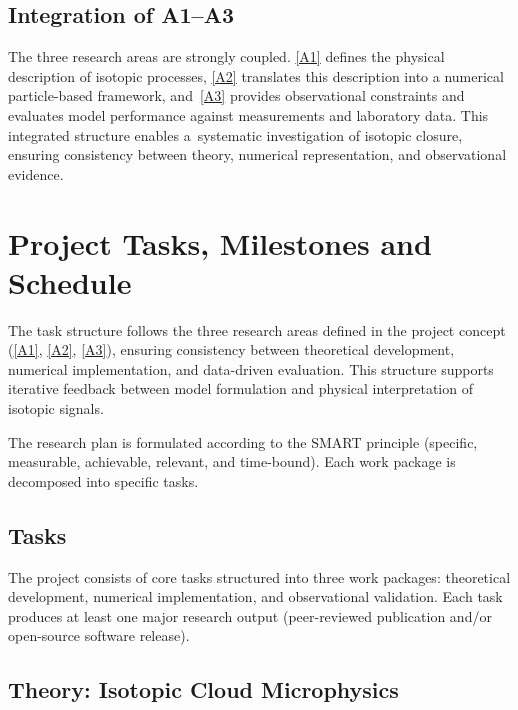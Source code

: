 \documentclass[12pt]{article}
\newcounter{task}
\begin{document}
\subsection*{Integration of A1--A3}
The three research areas are strongly coupled.
\ref{A1} defines the physical
description of isotopic processes,
\ref{A2} translates this description into a
numerical particle-based framework,
and~\ref{A3}
provides observational constraints and evaluates model performance
against measurements and laboratory data.
This integrated structure enables a~systematic investigation of isotopic
closure, ensuring consistency between theory, numerical representation, and
observational evidence.


\section{Project Tasks, Milestones and Schedule}
The task structure follows the three research areas defined in the project concept (\ref{A1}, \ref{A2}, \ref{A3}),
ensuring consistency between theoretical development,
numerical implementation, and data-driven evaluation.
This structure supports iterative feedback between model formulation
and physical interpretation of isotopic signals.

The research plan is formulated according to
the SMART principle (specific, measurable, achievable, relevant, and time-bound).
Each work package is decomposed into specific tasks.




\subsection*{Tasks}

The project consists of core tasks structured into three work packages:
theoretical development, numerical implementation, and observational validation.
Each task produces at least one major research output (peer-reviewed publication
and/or open-source software release).

\subsection{Theory: Isotopic Cloud Microphysics}
\end{document}
